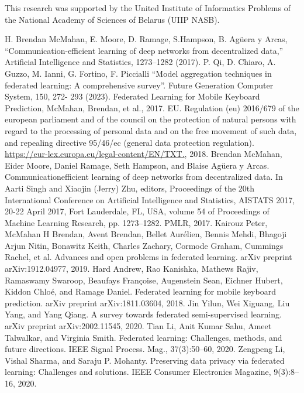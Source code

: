 \documentclass[twocolumn, 10pt]{article}
\begin{document}
This research was supported by the United Institute
of Informatics Problems of the National Academy of
Sciences of Belarus (UIIP NASB).
\begin{center}

\begin{thebibliography}{10} %
\fontsize{8}{5}\selectfont %
\setlength{\parindent}{0.0cm} %
\setlength{\parskip}{0.0cm} %
    \bibitem{}
    H. Brendan McMahan, E. Moore, D. Ramage, S.Hampson, B.
    Agüera y Arcas, “Communication-efficient learning of deep
    networks from decentralized data,” Artificial Intelligence and
    Statistics, 1273–1282 (2017).
    \vspace{0mm}
    \bibitem{}
    P. Qi, D. Chiaro, A. Guzzo, M. Ianni, G. Fortino, F. Piccialli
    “Model aggregation techniques in federated learning: A comprehensive survey”. Future Generation Computer System, 150, 272-
    293 (2023).
    \bibitem{}
    Federated Learning for Mobile Keyboard Prediction, McMahan,  Brendan, et al., 2017.
    \bibitem{}
    EU. Regulation (eu) 2016/679 of the european parliament and
    of the council on the protection of natural persons with regard
    to the processing of personal data and on the free movement of
    such data, and repealing directive 95/46/ec (general data protection regulation). \href{https://eur-lex.europa.eu/legal-content/EN/TXT.} {https://eur-lex.europa.eu/legal-content/EN/TXT.},
    2018. %
    \bibitem{}
    Brendan McMahan, Eider Moore, Daniel Ramage, Seth Hampson,
    and Blaise Agüera y Arcas. Communicationefficient learning
    of deep networks from decentralized data. In Aarti Singh and
    Xiaojin (Jerry) Zhu, editors, Proceedings of the 20th International
    Conference on Artificial Intelligence and Statistics, AISTATS
    2017, 20-22 April 2017, Fort Lauderdale, FL, USA, volume 54
    of Proceedings of Machine Learning Research, pp. 1273–1282.
    PMLR, 2017.
    \bibitem{}
    Kairouz Peter, McMahan H Brendan, Avent Brendan, Bellet
    Aurélien, Bennis Mehdi, Bhagoji Arjun Nitin, Bonawitz Keith,
    Charles Zachary, Cormode Graham, Cummings Rachel, et al.
    Advances and open problems in federated learning. arXiv preprint
    arXiv:1912.04977, 2019.
    \bibitem{}
    Hard Andrew, Rao Kanishka, Mathews Rajiv, Ramaswamy Swaroop, Beaufays Françoise, Augenstein Sean, Eichner Hubert, Kiddon Chloé, and Ramage Daniel. Federated learning for mobile keyboard prediction. arXiv preprint arXiv:1811.03604, 2018.
    \clearpage
    \bibitem{}
    Jin Yilun, Wei Xiguang, Liu Yang, and Yang Qiang. A survey towards federated semi-supervised learning. arXiv preprint
    arXiv:2002.11545, 2020.
    \bibitem{}
    Tian Li, Anit Kumar Sahu, Ameet Talwalkar, and Virginia Smith.
    Federated learning: Challenges, methods, and future directions.
    IEEE Signal Process. Mag., 37(3):50–60, 2020.
    \bibitem{}
    Zengpeng Li, Vishal Sharma, and Saraju P. Mohanty. Preserving
    data privacy via federated learning: Challenges and solutions.
    IEEE Consumer Electronics Magazine, 9(3):8–16, 2020.
\end{thebibliography}
\end{center}
\end{document}
